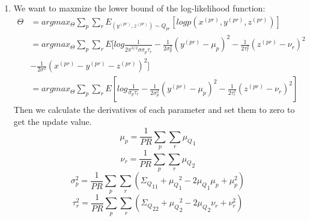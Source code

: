 \documentclass[12pt]{article}
\begin{document}
\begin{enumerate}[label=(\alph*)]
\begin{enumerate}[label=(\roman*)]
$$\begin{matrix}
            \end{matrix}\right]
            -
            \left[\begin{matrix}
                \sigma_p^2 \\
                \tau_r^2 \\
            \end{matrix}\right]\frac{            
                \left[\begin{matrix}
                    \sigma_p^2 & \tau_r^2
            \end{matrix}\right]}{\sigma^2+\sigma_p^2+\tau_r^2}
            $$
            The expression is:
            $$Q_{pr}(y^{(pr)},z^{(pr)}) = \frac{1}{\sqrt{{2\pi}^2|\Sigma_Q|}}exp(-\frac{1}{2}
            (\left[\begin{matrix}
                y^{(pr)} \\
                z^{(pr)} \\
            \end{matrix}\right]-\mu_Q)^T 
            \Sigma_Q^{-1}
            (\left[\begin{matrix}
                y^{(pr)} \\
                z^{(pr)} \\
            \end{matrix}\right]-\mu_Q)
            )$$
        \end{enumerate}
        \item We want to maxmize the lower bound of the log-likelihood function:
        \begin{equation*}
            \begin{split}
                \Theta &= argmax_\Theta \sum_p \sum_r E_{(y^{(pr)},z^{(pr)})\sim Q_{pr}}[logp(x^{(pr)},y^{(pr)},z^{(pr)})] \\
                &= argmax_\Theta  \sum_p \sum_r E
                [
                    log\frac{1}{{2\pi}^{3/2}\sigma \sigma_p \tau_r}
                    -\frac{1}{2\sigma_p^2}(y^{(pr)}-\mu_p)^2
                    -\frac{1}{2\tau_r^2}(z^{(pr)}-\nu_r)^2\\
                    &-\frac{1}{2\sigma^2}(x^{(pr)}-y^{(pr)}-z^{(pr)})^2
                ]\\
                &=argmax_\Theta  \sum_p \sum_r E
                [
                    log\frac{1}{\sigma_p \tau_r}
                    -\frac{1}{2\sigma_p^2}(y^{(pr)}-\mu_p)^2
                    -\frac{1}{2\tau_r^2}(z^{(pr)}-\nu_r)^2
                ]
            \end{split}
        \end{equation*}
        Then we calculate the derivatives of each parameter and set them to zero to get the update value.
        $$\mu_p = \frac{1}{PR} \sum_p \sum_r {\mu_Q}_1$$
        $$\nu_r = \frac{1}{PR} \sum_p \sum_r {\mu_Q}_2$$
        $$\sigma_p^2 =\frac{1}{PR}\sum_p \sum_r ({\Sigma_Q}_{11}+{\mu_Q}_1^2-2{\mu_Q}_1\mu_p+\mu_p^2) $$
        $$\tau_r^2 =\frac{1}{PR}\sum_p \sum_r ({\Sigma_Q}_{22}+{\mu_Q}_2^2-2{\mu_Q}_2\nu_r+\nu_r^2) $$
    \end{enumerate}
\end{document}

